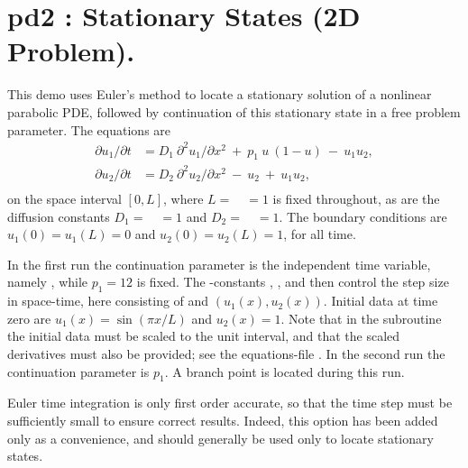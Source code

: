 \documentclass[12pt]{report}
\begin{document}
\section{ pd2 : Stationary States (2D Problem).} \label{sec:Demos_pd2}
This demo uses Euler's method to locate a stationary solution of
a nonlinear parabolic PDE, followed by continuation of this stationary
state in a free problem parameter. The equations are
\begin{equation} \begin{array}{cl}
  {\partial u_1 / \partial t} &= D_1~{\partial^2 u_1 / \partial x^2}
  ~+~  p_1~ u ~( 1-u) ~-~ u_1 u_2 , \\
  {\partial u_2 / \partial t} 
  &= D_2~{\partial^2 u_2 / \partial x^2} ~-~ u_2 ~+~ u_1 u_2 , \\
\end{array} \end{equation}
on the space interval $[0,L]$, where $L=$~~$=1$ is fixed throughout,
as are the diffusion constants $D_1=$~~$=1$ and $D_2=$~~$=1$.
The boundary conditions are $u_1(0) = u_1(L) = 0$ and $u_2(0) = u_2(L) = 1$,
for all time.

In the first run the continuation parameter is the independent time variable,
namely , while $p_1=12$ is fixed.
The \AUTO-constants , , and  then control the step size
in space-time, here consisting of  and $(u_1(x),u_2(x))$.
Initial data at time zero are $u_1(x)=\sin(\pi x/L)$ and $u_2(x)=1$.
Note that in the subroutine  the initial data must be scaled to 
the unit interval, and that the scaled derivatives must also be provided; 
see the equations-file .
In the second run the continuation parameter is $p_1$.
A branch point is located during this run.

Euler time integration is only first order accurate, so that
the time step must be sufficiently small to ensure correct results.
Indeed, this option has been added only as a convenience, and should 
generally be used only to locate stationary states.
\end{document}
